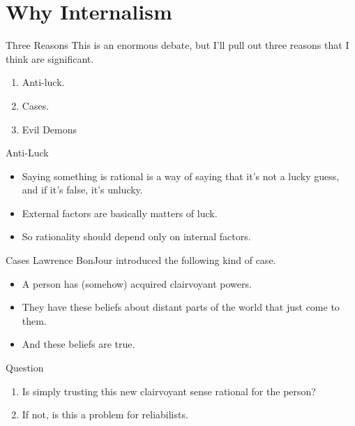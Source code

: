 \documentclass[
  17pt,
  letterpaper,
  ignorenonframetext,
  aspectratio=169,
  handout]{beamer}
\providecommand{\tightlist}{%
  \setlength{\itemsep}{0pt}\setlength{\parskip}{0pt}}\usepackage{longtable,booktabs,array}
\begin{document}
\hypertarget{why-internalism}{%
\section{Why Internalism}\label{why-internalism}}

\begin{frame}{Three Reasons}
\protect\hypertarget{three-reasons}{}
This is an enormous debate, but I'll pull out three reasons that I think
are significant.

\begin{enumerate}[<+->]
\tightlist
\item
  Anti-luck.
\item
  Cases.
\item
  Evil Demons
\end{enumerate}
\end{frame}

\begin{frame}{Anti-Luck}
\protect\hypertarget{anti-luck}{}
\begin{itemize}[<+->]
\tightlist
\item
  Saying something is rational is a way of saying that it's not a lucky
  guess, and if it's false, it's unlucky.
\item
  External factors are basically matters of luck.
\item
  So rationality should depend only on internal factors.
\end{itemize}
\end{frame}

\begin{frame}{Cases}
\protect\hypertarget{cases}{}
Lawrence BonJour introduced the following kind of case.

\begin{itemize}[<+->]
\tightlist
\item
  A person has (somehow) acquired clairvoyant powers.
\item
  They have these beliefs about distant parts of the world that just
  come to them.
\item
  And these beliefs are true.
\end{itemize}
\end{frame}

\begin{frame}{Question}
\protect\hypertarget{question}{}
\begin{enumerate}[<+->]
\tightlist
\item
  Is simply trusting this new clairvoyant sense rational for the person?
\item
  If not, is this a problem for reliabilists.
\end{enumerate}
\end{frame}
\end{document}
